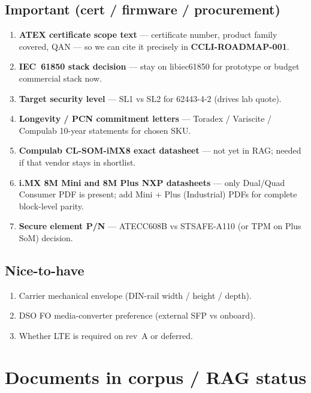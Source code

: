 \documentclass[10pt,a4paper]{article}
\newcommand{\docref}[1]{\textbf{#1}}
\begin{document}
\subsection{Important (cert / firmware / procurement)}

\begin{enumerate}[leftmargin=*, resume]
  \item \textbf{ATEX certificate scope text} --- certificate number, product family covered, QAN --- so we can cite it precisely in \docref{CCLI-ROADMAP-001}.
  \item \textbf{IEC~61850 stack decision} --- stay on libiec61850 for prototype or budget commercial stack now.
  \item \textbf{Target security level} --- SL1 vs SL2 for 62443-4-2 (drives lab quote).
  \item \textbf{Longevity / PCN commitment letters} --- Toradex / Variscite / Compulab 10-year statements for chosen SKU.
  \item \textbf{Compulab CL-SOM-iMX8 exact datasheet} --- not yet in RAG; needed if that vendor stays in shortlist.
  \item \textbf{i.MX 8M Mini and 8M Plus NXP datasheets} --- only Dual/Quad Consumer PDF is present; add Mini + Plus (Industrial) PDFs for complete block-level parity.
  \item \textbf{Secure element P/N} --- ATECC608B vs STSAFE-A110 (or TPM on Plus SoM) decision.
\end{enumerate}

\subsection{Nice-to-have}

\begin{enumerate}[leftmargin=*, resume]
  \item Carrier mechanical envelope (DIN-rail width / height / depth).
  \item DSO FO media-converter preference (external SFP vs onboard).
  \item Whether LTE is required on rev~A or deferred.
\end{enumerate}

\section{Documents in corpus / RAG status}
\label{sec:rag}
\end{document}
